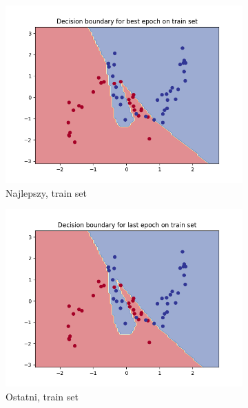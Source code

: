 \documentclass[12pt]{article}
\newcommand*{\subfigwidth}{0.24\textwidth}
\begin{document}
\begin{figure}[H]
\begin{subfigure}[t]{\subfigwidth}
        \includegraphics[width=\linewidth]{img/exp_4/set_0.2/best/train_boundary.png}
        \caption{Najlepszy, train set}
    \end{subfigure}
    \hfill
    \begin{subfigure}[t]{\subfigwidth}
        \includegraphics[width=\linewidth]{img/exp_4/set_0.2/last/train_boundary.png}
        \caption{Ostatni, train set}
    \end{subfigure}
    \\
    \hspace{\subfigwidth}
    \hfill
    \begin{subfigure}[t]{\subfigwidth}

\end{subfigure}
\end{figure}
\end{document}

